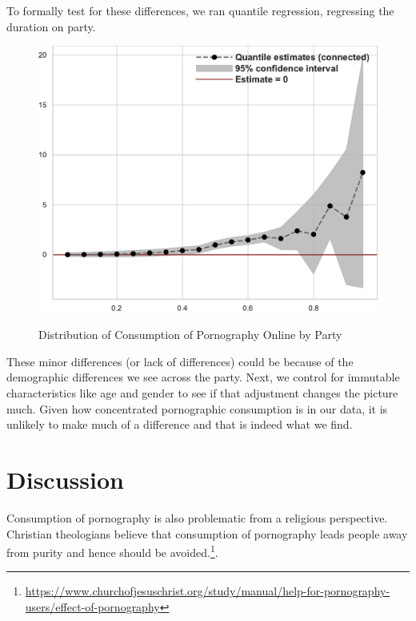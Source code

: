 \documentclass[12pt, letterpaper]{article}
\begin{document}
To formally test for these differences, we ran quantile regression, regressing the duration on party. 

\begin{figure}[h]
\centering
\caption{Distribution of Consumption of Pornography Online by Party}
\includegraphics[scale=.75]{../figs/quantile_reg_nonzero_duration_adult.pdf}
\label{fig:quantile_regression_duration}
\end{figure}

These minor differences (or lack of differences) could be because of the demographic differences we see across the party. Next, we control for immutable characteristics like age and gender to see if that adjustment changes the picture much. Given how concentrated pornographic consumption is in our data, it is unlikely to make much of a difference and that is indeed what we find. 



\section*{Discussion}
Consumption of pornography is also problematic from a religious perspective. Christian theologians believe that consumption of pornography leads people away from purity and hence should be avoided.\footnote{\url{https://www.churchofjesuschrist.org/study/manual/help-for-pornography-users/effect-of-pornography}}.
\clearpage


\clearpage
\appendix
\renewcommand{\thesection}{SI \arabic{section}}
\renewcommand\thetable{\thesection.\arabic{table}}  
\renewcommand\thefigure{\thesection.\arabic{figure}}
\end{document}
